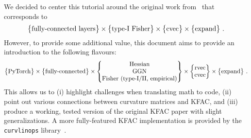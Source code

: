 We decided to center this tutorial around the original work from~\citet{martens2015optimizing} that corresponds to
\begin{align*}
  \begin{Bmatrix}
    \text{fully-connected layers}
  \end{Bmatrix}
  \times
  \begin{Bmatrix}
    \text{type-I Fisher}
  \end{Bmatrix}
  \times
  \begin{Bmatrix}
    \operatorname{cvec}
  \end{Bmatrix}
  \times
  \begin{Bmatrix}
    \text{expand}
  \end{Bmatrix}\,.
\end{align*}
However, to provide some additional value, this document aims to provide an introduction to the following flavours:
\begin{align*}
  \begin{Bmatrix}
    \text{PyTorch}
  \end{Bmatrix}
  \times
  \begin{Bmatrix}
    \text{fully-connected}
  \end{Bmatrix}
  \times
  \begin{Bmatrix}
    \text{Hessian}
    \\
    \text{GGN}
    \\
    \text{Fisher (type-I/II, empirical)}
  \end{Bmatrix}
  \times
  \begin{Bmatrix}
    \operatorname{rvec}
    \\
    \operatorname{cvec}
  \end{Bmatrix}
  \times
  \begin{Bmatrix}
    \text{expand}
  \end{Bmatrix}\,.
\end{align*}
This allows us to (i) highlight challenges when translating math to code, (ii) point out various connections between curvature matrices and KFAC, and (iii) produce a working, tested version of the original KFAC paper with slight generalizations.
A more fully-featured KFAC implementation is provided by the \texttt{curvlinops} library~\cite{dangel2025position}.
